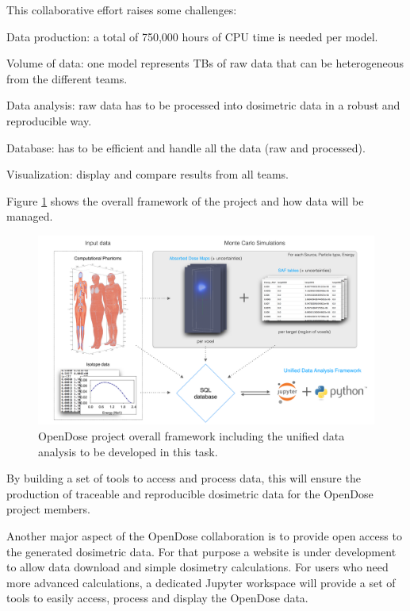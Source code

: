   This collaborative effort raises some challenges:
  \begin{compactitem}
  \item Data production: a total of 750,000 hours of CPU time is needed per
    model.
  \item Volume of data: one model represents TBs of raw data that can be
    heterogeneous from the different teams.
  \item Data analysis: raw data has to be processed into dosimetric data in a
    robust and reproducible way.
  \item Database: has to be efficient and handle all the data (raw and
    processed).
  \item Visualization: display and compare results from all teams.
  \end{compactitem}

Figure
  \ref{fig:opendose_framework} shows the overall framework of the project and
  how data will be managed.

  \begin{figure}[t!]
    \centering
    \includegraphics[width=1.0\textwidth]{images/opendose_framework.pdf}
    \caption{OpenDose project overall framework including the unified data
    analysis to be developed in this task.}
    \label{fig:opendose_framework}
  \end{figure}

  By building a set of tools to access and process data, this will ensure the
  production of traceable and reproducible dosimetric data for the OpenDose
  project members.

  Another major aspect of the OpenDose collaboration is to provide open
  access to the generated dosimetric data. For that purpose a website is under
  development to allow data download and simple dosimetry calculations. For
  users who need more advanced calculations, a dedicated Jupyter workspace will
  provide a set of tools to easily access, process and display the OpenDose
  data.

